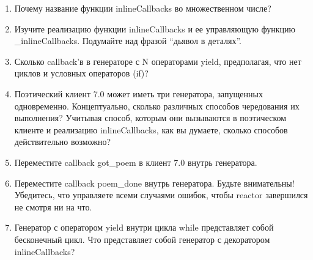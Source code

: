 \begin{enumerate}

\item Почему название функции inlineCallbacks во 
    множественном числе?

\item Изучите реализацию функции inlineCallbacks и ее 
    управляющую функцию \_inlineCallbacks. Подумайте над 
    фразой ``дьявол в деталях''.

\item Сколько callback'в в генераторе с N 
    операторами yield, предполагая, что нет циклов и 
    условных операторов (if)? 



\item Поэтический клиент 7.0 может иметь три генератора, 
    запущенных одновременно. Концептуально, сколько различных 
    способов чередования их выполнения? Учитывая способ, 
    которым они вызываются в поэтическом клиенте и 
    реализацию inlineCallbacks, как вы думаете, сколько 
    способов действительно возможно?

\item Переместите callback got\_poem в клиент 7.0 внутрь генератора.


\item Переместите callback poem\_done внутрь генератора. 
    Будьте внимательны! Убедитесь, что управляете всеми 
    случаями ошибок, чтобы reactor завершился не смотря 
    ни на что. 

\item Генератор с оператором yield внутри цикла while 
    представляет собой бесконечный цикл. Что представляет собой 
    генератор с декоратором inlineCallbacks?

\end{enumerate}



